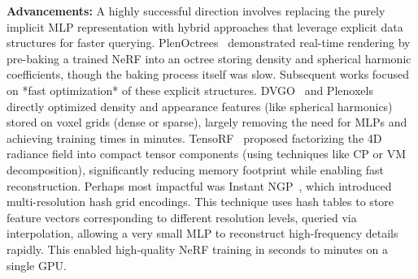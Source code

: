 \textbf{Advancements:} A highly successful direction involves replacing the purely implicit MLP representation with hybrid approaches that leverage explicit data structures for faster querying. PlenOctrees~\cite{yu2021plenoctrees} demonstrated real-time rendering by pre-baking a trained NeRF into an octree storing density and spherical harmonic coefficients, though the baking process itself was slow. Subsequent works focused on *fast optimization* of these explicit structures. DVGO~\cite{sun2022dvgo} and Plenoxels~\cite{fridovichkeil2022plenoxels} directly optimized density and appearance features (like spherical harmonics) stored on voxel grids (dense or sparse), largely removing the need for MLPs and achieving training times in minutes. TensoRF~\cite{chen2022tensorf} proposed factorizing the 4D radiance field into compact tensor components (using techniques like CP or VM decomposition), significantly reducing memory footprint while enabling fast reconstruction. Perhaps most impactful was Instant NGP~\cite{mueller2022instant}, which introduced multi-resolution hash grid encodings. This technique uses hash tables to store feature vectors corresponding to different resolution levels, queried via interpolation, allowing a very small MLP to reconstruct high-frequency details rapidly. This enabled high-quality NeRF training in seconds to minutes on a single GPU.

